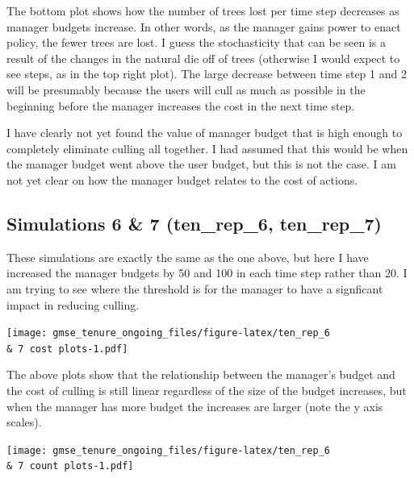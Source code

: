 \documentclass[
]{article}
\begin{document}
The bottom plot shows how the number of trees lost per time step
decreases as manager budgets increase. In other words, as the manager
gains power to enact policy, the fewer trees are lost. I guess the
stochasticity that can be seen is a result of the changes in the natural
die off of trees (otherwise I would expect to see steps, as in the top
right plot). The large decrease between time step 1 and 2 will be
presumably because the users will cull as much as possible in the
beginning before the manager increases the cost in the next time step.

I have clearly not yet found the value of manager budget that is high
enough to completely eliminate culling all together. I had assumed that
this would be when the manager budget went above the user budget, but
this is not the case. I am not yet clear on how the manager budget
relates to the cost of actions.

\hypertarget{simulations-6-7-ten_rep_6-ten_rep_7}{%
\subsection{Simulations 6 \& 7 (ten\_rep\_6,
ten\_rep\_7)}\label{simulations-6-7-ten_rep_6-ten_rep_7}}

These simulations are exactly the same as the one above, but here I have
increased the manager budgets by 50 and 100 in each time step rather
than 20. I am trying to see where the threshold is for the manager to
have a signficant impact in reducing culling.

\texttt{[image: gmse\_tenure\_ongoing\_files/figure-latex/ten\_rep\_6 \\\& 7 cost plots-1.pdf]}

The above plots show that the relationship between the manager's budget
and the cost of culling is still linear regardless of the size of the
budget increases, but when the manager has more budget the increases are
larger (note the y axis scales).

\texttt{[image: gmse\_tenure\_ongoing\_files/figure-latex/ten\_rep\_6 \\\& 7 count plots-1.pdf]}
\end{document}
